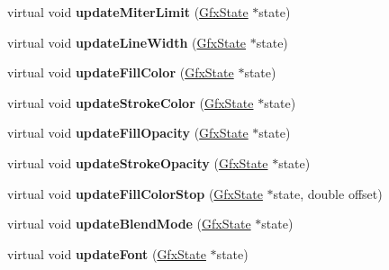 \begin{DoxyCompactItemize}
virtual void {\bfseries update\+Miter\+Limit} (\hyperlink{class_gfx_state}{Gfx\+State} $\ast$state)
\item 
\mbox{\label{class_cairo_output_dev_a3fdfd4ddb8aacd10f883a4f0044af46f}} 
virtual void {\bfseries update\+Line\+Width} (\hyperlink{class_gfx_state}{Gfx\+State} $\ast$state)
\item 
\mbox{\label{class_cairo_output_dev_a7172653bc666b4439eb3e69fa1af8e6b}} 
virtual void {\bfseries update\+Fill\+Color} (\hyperlink{class_gfx_state}{Gfx\+State} $\ast$state)
\item 
\mbox{\label{class_cairo_output_dev_a4584d1c79adfe3bd9d9453c8ca12f45a}} 
virtual void {\bfseries update\+Stroke\+Color} (\hyperlink{class_gfx_state}{Gfx\+State} $\ast$state)
\item 
\mbox{\label{class_cairo_output_dev_a802221312bae1d91d7b66a63447fd757}} 
virtual void {\bfseries update\+Fill\+Opacity} (\hyperlink{class_gfx_state}{Gfx\+State} $\ast$state)
\item 
\mbox{\label{class_cairo_output_dev_aba391dfc23d2ef28e873ad20228786d0}} 
virtual void {\bfseries update\+Stroke\+Opacity} (\hyperlink{class_gfx_state}{Gfx\+State} $\ast$state)
\item 
\mbox{\label{class_cairo_output_dev_a2553dc57cfdcef86b9ab8b18934acbec}} 
virtual void {\bfseries update\+Fill\+Color\+Stop} (\hyperlink{class_gfx_state}{Gfx\+State} $\ast$state, double offset)
\item 
\mbox{\label{class_cairo_output_dev_a4a20c396178526a60f5ac0971a311602}} 
virtual void {\bfseries update\+Blend\+Mode} (\hyperlink{class_gfx_state}{Gfx\+State} $\ast$state)
\item 
\mbox{\label{class_cairo_output_dev_a34950406a949494ba14ece6b376b2e62}} 
virtual void {\bfseries update\+Font} (\hyperlink{class_gfx_state}{Gfx\+State} $\ast$state)
\item 
\mbox{\label{class_cairo_output_dev_a705190074dbbfbd1668e5b70ffa35e1a}} 

\end{DoxyCompactItemize}
